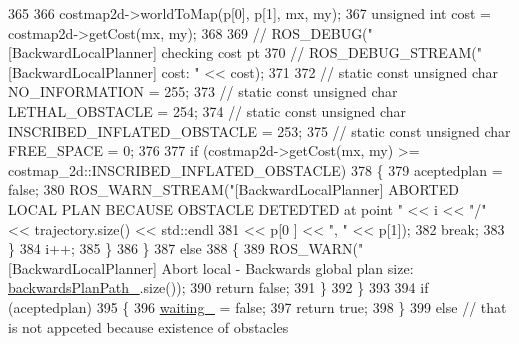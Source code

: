\begin{DoxyCode}
{365 
366                         costmap2d->worldToMap(p[0], p[1], mx, my);
367                         \textcolor{keywordtype}{unsigned} \textcolor{keywordtype}{int} cost = costmap2d->getCost(mx, my);
368 
369                         \textcolor{comment}{// ROS\_DEBUG("[BackwardLocalPlanner] checking cost pt %
370                         \textcolor{comment}{// ROS\_DEBUG\_STREAM("[BackwardLocalPlanner] cost: " << cost);}
371 
372                         \textcolor{comment}{// static const unsigned char NO\_INFORMATION = 255;}
373                         \textcolor{comment}{// static const unsigned char LETHAL\_OBSTACLE = 254;}
374                         \textcolor{comment}{// static const unsigned char INSCRIBED\_INFLATED\_OBSTACLE = 253;}
375                         \textcolor{comment}{// static const unsigned char FREE\_SPACE = 0;}
376 
377                         \textcolor{keywordflow}{if} (costmap2d->getCost(mx, my) >= costmap\_2d::INSCRIBED\_INFLATED\_OBSTACLE)
378                         \{
379                             aceptedplan = \textcolor{keyword}{false};
380                             ROS\_WARN\_STREAM(\textcolor{stringliteral}{"[BackwardLocalPlanner] ABORTED LOCAL PLAN BECAUSE OBSTACLE
       DETEDTED at point "} << i << \textcolor{stringliteral}{"/"} << trajectory.size() << std::endl
381                                                                                                      << p[0
      ] << \textcolor{stringliteral}{", "} << p[1]);
382                             \textcolor{keywordflow}{break};
383                         \}
384                         i++;
385                     \}
386                 \}
387                 \textcolor{keywordflow}{else}
388                 \{
389                     ROS\_WARN(\textcolor{stringliteral}{"[BackwardLocalPlanner] Abort local - Backwards global plan size: %
      \hyperlink{classcl__move__base__z_1_1backward__local__planner_1_1BackwardLocalPlanner_ad9cde5c85f782cab2ddb4030e3c3f2cf}{backwardsPlanPath\_}.size());
390                     \textcolor{keywordflow}{return} \textcolor{keyword}{false};
391                 \}
392             \}
393 
394             \textcolor{keywordflow}{if} (aceptedplan)
395             \{
396                 \hyperlink{classcl__move__base__z_1_1backward__local__planner_1_1BackwardLocalPlanner_a00849266e4bdd9379c3717e8a41c303e}{waiting\_} = \textcolor{keyword}{false};
397                 \textcolor{keywordflow}{return} \textcolor{keyword}{true};
398             \}
399             \textcolor{keywordflow}{else} \textcolor{comment}{// that is not appceted because existence of obstacles}
}}}
\end{DoxyCode}
